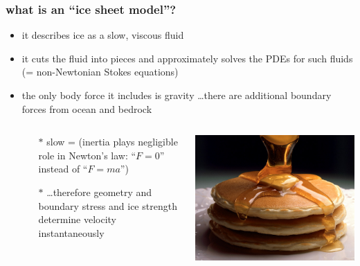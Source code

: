 \documentclass{beamer}
\begin{document}
\begin{frame}
  \frametitle{what is an ``ice sheet model''?}
\small

\vspace{-0.4cm}

\begin{itemize}
\item it describes ice as a slow, viscous fluid
\item it cuts the fluid into pieces and approximately solves the PDEs for such fluids (= non-Newtonian Stokes equations)
\item the only body force it includes is gravity \dots there are additional boundary forces from ocean and bedrock
  \begin{columns}
  \begin{column}{0.6\textwidth}
  \begin{itemize}
  \small
  \item[$\ast$] slow = (inertia plays negligible role in Newton's law: ``$F=0$'' instead of ``$F=ma$'')
  \item[$\ast$] \dots therefore geometry and boundary stress and ice strength determine velocity instantaneously
  \normalsize
  \end{itemize}
  \end{column}
  \begin{column}{0.3\textwidth}
  \includegraphics[width=\textwidth]{pancakes}
  \end{column}
  \end{columns}
\end{itemize}
\end{frame}
\end{document}
